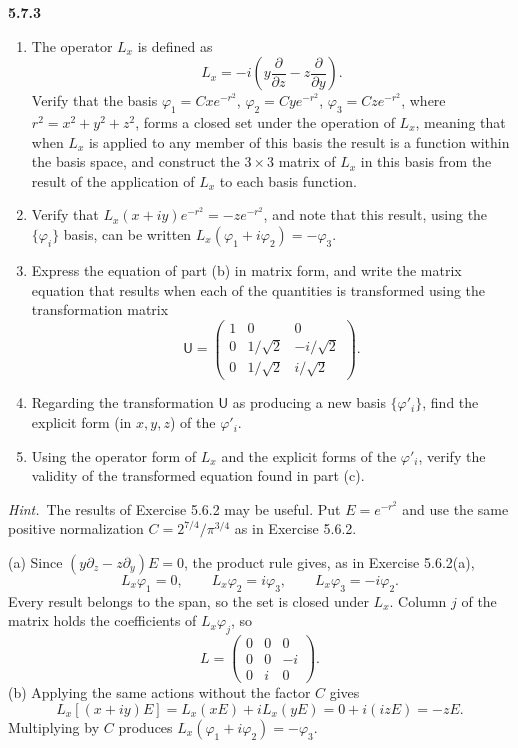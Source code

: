 \par\bigskip
\noindent\textbf{5.7.3}\quad
\begin{enumerate}
\item[(a)] The operator $L_{x}$ is defined as
  \[
  L_{x}=-i\left(y\frac{\partial}{\partial z}-z\frac{\partial}{\partial y}
  \right).
  \]
  Verify that the basis $\varphi_{1}=Cxe^{-r^{2}}$,
  $\varphi_{2}=Cye^{-r^{2}}$, $\varphi_{3}=Cze^{-r^{2}}$, where
  $r^{2}=x^{2}+y^{2}+z^{2}$, forms a closed set under the operation of
  $L_{x}$, meaning that when $L_{x}$ is applied to any member of this basis
  the result is a function within the basis space, and construct the
  $3\times3$ matrix of $L_{x}$ in this basis from the result of the
  application of $L_{x}$ to each basis function.
\item[(b)] Verify that $L_{x}(x+iy)e^{-r^{2}}=-ze^{-r^{2}}$, and note that
  this result, using the $\{\varphi_{i}\}$ basis, can be written
  $L_{x}(\varphi_{1}+i\varphi_{2})=-\varphi_{3}$.
\item[(c)] Express the equation of part (b) in matrix form, and write the
  matrix equation that results when each of the quantities is transformed
  using the transformation matrix
  \[
  \mathsf{U}=\begin{pmatrix}1&0&0\\0&1/\sqrt{2}&-i/\sqrt{2}\\
  0&1/\sqrt{2}&i/\sqrt{2}\end{pmatrix}.
  \]
\item[(d)] Regarding the transformation $\mathsf{U}$ as producing a new basis
  $\{\varphi'_{i}\}$, find the explicit form (in $x,y,z$) of the
  $\varphi'_{i}$.
\item[(e)] Using the operator form of $L_{x}$ and the explicit forms of the
  $\varphi'_{i}$, verify the validity of the transformed equation found in
  part (c).
\end{enumerate}
\emph{Hint.}~The results of Exercise 5.6.2 may be useful.
\solution
Put $E=e^{-r^2}$ and use the same positive normalization
$C=2^{7/4}/\pi^{3/4}$ as in Exercise 5.6.2.

(a) Since $(y\partial_z-z\partial_y)E=0$, the product rule gives, as in
Exercise 5.6.2(a),
\[
L_x\varphi_1=0,\qquad L_x\varphi_2=i\varphi_3,\qquad
L_x\varphi_3=-i\varphi_2.
\]
Every result belongs to the span, so the set is closed under $L_x$.
Column $j$ of the matrix holds the coefficients of $L_x\varphi_j$, so
\[
L=\begin{pmatrix}0&0&0\\0&0&-i\\0&i&0\end{pmatrix}.
\]
(b) Applying the same actions without the factor $C$ gives
\[
L_x[(x+iy)E]=L_x(xE)+iL_x(yE)=0+i(izE)=-zE.
\]
Multiplying by $C$ produces
$L_x(\varphi_1+i\varphi_2)=-\varphi_3$.

